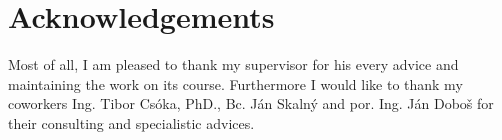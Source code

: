 \thispagestyle{empty}
\section*{Acknowledgements}
\noindent
Most of all, I am pleased to thank my supervisor for his every advice and maintaining the work on its course. Furthermore I would like to thank my coworkers Ing. Tibor Csóka, PhD., Bc. Ján Skalný and por. Ing. Ján Doboš for their consulting and specialistic advices. 

\newpage
\thispagestyle{empty}
\mbox{}
\newpage
